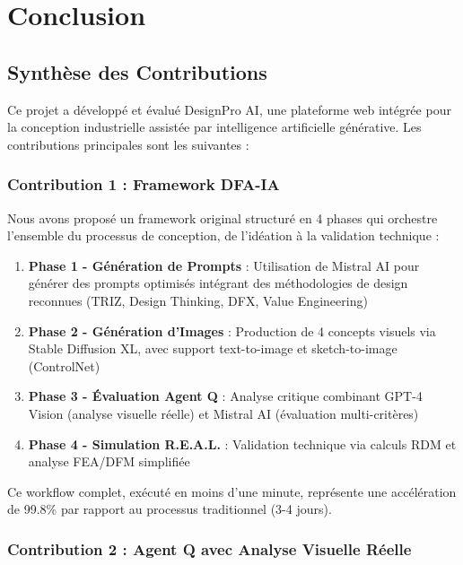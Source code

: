 \section{Conclusion}

\subsection{Synthèse des Contributions}

Ce projet a développé et évalué DesignPro AI, une plateforme web intégrée pour la conception industrielle assistée par intelligence artificielle générative. Les contributions principales sont les suivantes :

\subsubsection{Contribution 1 : Framework DFA-IA}

Nous avons proposé un framework original structuré en 4 phases qui orchestre l'ensemble du processus de conception, de l'idéation à la validation technique :

\begin{enumerate}[leftmargin=*]
    \item \textbf{Phase 1 - Génération de Prompts} : Utilisation de Mistral AI pour générer des prompts optimisés intégrant des méthodologies de design reconnues (TRIZ, Design Thinking, DFX, Value Engineering)
    
    \item \textbf{Phase 2 - Génération d'Images} : Production de 4 concepts visuels via Stable Diffusion XL, avec support text-to-image et sketch-to-image (ControlNet)
    
    \item \textbf{Phase 3 - Évaluation Agent Q} : Analyse critique combinant GPT-4 Vision (analyse visuelle réelle) et Mistral AI (évaluation multi-critères)
    
    \item \textbf{Phase 4 - Simulation R.E.A.L.} : Validation technique via calculs RDM et analyse FEA/DFM simplifiée
\end{enumerate}

Ce workflow complet, exécuté en moins d'une minute, représente une accélération de 99.8\% par rapport au processus traditionnel (3-4 jours).

\subsubsection{Contribution 2 : Agent Q avec Analyse Visuelle Réelle}

